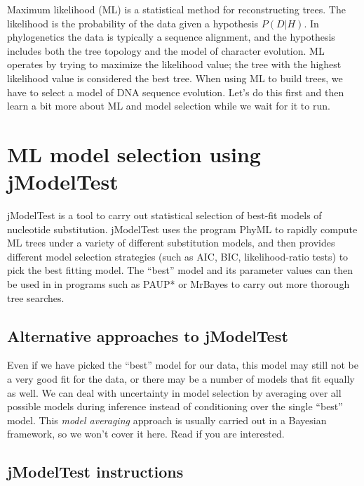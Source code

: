 \documentclass[11pt]{article}
\begin{document}
Maximum likelihood (ML) is a statistical method for reconstructing trees.  
The likelihood is the probability of the data given a hypothesis $P(D|H)$.
In phylogenetics the data is typically a sequence alignment, and the hypothesis includes
both the tree topology and the model of character evolution.
ML operates by trying to maximize the
likelihood value;
the tree with the highest likelihood value is considered the best tree.  
When using ML to build trees, 
we have to select a model of DNA sequence evolution. 
Let's do this first and then learn a bit more about ML and model selection while we wait for it to run.

\section{ML model selection using jModelTest}

jModelTest \citep{darriba2012jmodeltest} is a tool to carry out statistical selection of best-fit models of nucleotide substitution.
jModelTest uses the program PhyML \citep{guindon2010new}
to rapidly compute ML trees under a variety of different substitution models,
and then provides different model selection strategies (such as AIC, BIC, likelihood-ratio tests)
to pick the best fitting model.
The ``best'' model and its parameter values can then be used in 
in programs such as PAUP* or MrBayes to carry out more thorough tree searches.

\subsection{Alternative approaches to jModelTest}

Even if we have picked the ``best'' model for our data, this model may still not be a very good
fit for the data, or there may be a number of models that fit equally as well.
We can deal with uncertainty in model selection by averaging over all possible
models during inference instead of conditioning over the single ``best'' model.
This \textit{model averaging} approach is usually carried out in a Bayesian framework,
so we won't cover it here. Read \citet{huelsenbeck2004bayesian} if you are interested.

\subsection{jModelTest instructions}
\end{document}
